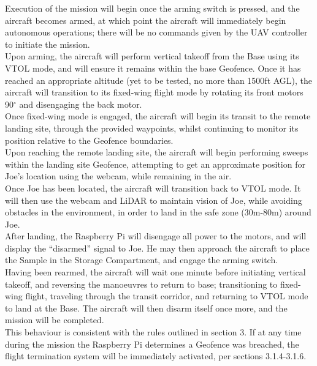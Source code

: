 Execution of the mission will begin once the arming switch is pressed, and the aircraft becomes armed, at which point the aircraft will immediately begin autonomous operations; there will be no commands given by the UAV controller to initiate the mission.\\

Upon arming, the aircraft will perform vertical takeoff from the Base using its VTOL mode, and will ensure it remains within the base Geofence. Once it has reached an appropriate altitude (yet to be tested, no more than 1500ft AGL), the aircraft will transition to its fixed-wing flight mode by rotating its front motors 90$^\circ$ and disengaging the back motor.\\

Once fixed-wing mode is engaged, the aircraft will begin its transit to the remote landing site, through the provided waypoints, whilst continuing to monitor its position relative to the Geofence boundaries.\\

Upon reaching the remote landing site, the aircraft will begin performing sweeps within the landing site Geofence, attempting to get an approximate position for Joe's location using the webcam, while remaining in the air.\\

Once Joe has been located, the aircraft will transition back to VTOL mode. It will then use the webcam and LiDAR to maintain vision of Joe, while avoiding obstacles in the environment, in order to land in the safe zone (30m-80m) around Joe.\\

After landing, the Raspberry Pi will disengage all power to the motors, and will display the ``disarmed'' signal to Joe. He may then approach the aircraft to place the Sample in the Storage Compartment, and engage the arming switch.\\

Having been rearmed, the aircraft will wait one minute before initiating vertical takeoff, and reversing the manoeuvres to return to base; transitioning to fixed-wing flight, traveling through the transit corridor, and returning to VTOL mode to land at the Base. The aircraft will then disarm itself once more, and the mission will be completed.\\

This behaviour is consistent with the rules outlined in section 3. If at any time during the mission the Raspberry Pi determines a Geofence was breached, the flight termination system will be immediately activated, per sections 3.1.4-3.1.6.\\